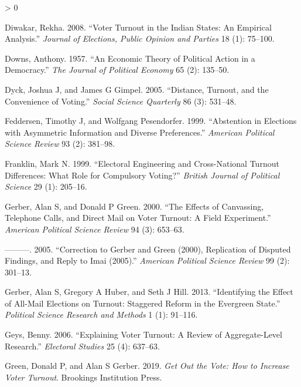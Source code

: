\documentclass[
  12pt,
]{article}
\newlength{\cslhangindent}
\newenvironment{CSLReferences}[2] %
 {%
  \setlength{\parindent}{0pt}
  \ifodd #1 \everypar{\setlength{\hangindent}{\cslhangindent}}\ignorespaces\fi
  \ifnum #2 > 0
  \setlength{\parskip}{#2\baselineskip}
  \fi
 }%
 {}
\begin{document}
\begin{CSLReferences}{1}{0}
\leavevmode\hypertarget{ref-diwakar2008voter}{}%
Diwakar, Rekha. 2008. {``Voter Turnout in the Indian States: An
Empirical Analysis.''} \emph{Journal of Elections, Public Opinion and
Parties} 18 (1): 75--100.

\leavevmode\hypertarget{ref-downs1957economic}{}%
Downs, Anthony. 1957. {``An Economic Theory of Political Action in a
Democracy.''} \emph{The Journal of Political Economy} 65 (2): 135--50.

\leavevmode\hypertarget{ref-dyck2005distance}{}%
Dyck, Joshua J, and James G Gimpel. 2005. {``Distance, Turnout, and the
Convenience of Voting.''} \emph{Social Science Quarterly} 86 (3):
531--48.

\leavevmode\hypertarget{ref-feddersen1999abstention}{}%
Feddersen, Timothy J, and Wolfgang Pesendorfer. 1999. {``Abstention in
Elections with Asymmetric Information and Diverse Preferences.''}
\emph{American Political Science Review} 93 (2): 381--98.

\leavevmode\hypertarget{ref-franklin1999electoral}{}%
Franklin, Mark N. 1999. {``Electoral Engineering and Cross-National
Turnout Differences: What Role for Compulsory Voting?''} \emph{British
Journal of Political Science} 29 (1): 205--16.

\leavevmode\hypertarget{ref-gerber2000effects}{}%
Gerber, Alan S, and Donald P Green. 2000. {``The Effects of Canvassing,
Telephone Calls, and Direct Mail on Voter Turnout: A Field
Experiment.''} \emph{American Political Science Review} 94 (3): 653--63.

\leavevmode\hypertarget{ref-gerber2005correction}{}%
---------. 2005. {``Correction to Gerber and Green (2000), Replication
of Disputed Findings, and Reply to Imai (2005).''} \emph{American
Political Science Review} 99 (2): 301--13.

\leavevmode\hypertarget{ref-gerber2013identifying}{}%
Gerber, Alan S, Gregory A Huber, and Seth J Hill. 2013. {``Identifying
the Effect of All-Mail Elections on Turnout: Staggered Reform in the
Evergreen State.''} \emph{Political Science Research and Methods} 1 (1):
91--116.

\leavevmode\hypertarget{ref-geys2006explaining}{}%
Geys, Benny. 2006. {``Explaining Voter Turnout: A Review of
Aggregate-Level Research.''} \emph{Electoral Studies} 25 (4): 637--63.

\leavevmode\hypertarget{ref-green2019get}{}%
Green, Donald P, and Alan S Gerber. 2019. \emph{Get Out the Vote: How to
Increase Voter Turnout}. Brookings Institution Press.


\end{CSLReferences}
\end{document}
